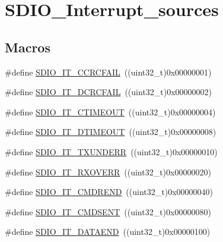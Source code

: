 \hypertarget{group___s_d_i_o___interrupt__sources}{}\section{S\+D\+I\+O\+\_\+\+Interrupt\+\_\+sources}
\label{group___s_d_i_o___interrupt__sources}
\subsection*{Macros}
\begin{DoxyCompactItemize}
\item 
\#define \mbox{\hyperlink{group___s_d_i_o___interrupt__sources_gabb076105e18355a260c40a379511e72f}{S\+D\+I\+O\+\_\+\+I\+T\+\_\+\+C\+C\+R\+C\+F\+A\+IL}}~((uint32\+\_\+t)0x00000001)
\item 
\#define \mbox{\hyperlink{group___s_d_i_o___interrupt__sources_gaf3321305cb4e24419185a4b92ead299a}{S\+D\+I\+O\+\_\+\+I\+T\+\_\+\+D\+C\+R\+C\+F\+A\+IL}}~((uint32\+\_\+t)0x00000002)
\item 
\#define \mbox{\hyperlink{group___s_d_i_o___interrupt__sources_ga3c2fdef0993f10e65d4fddbdf71febed}{S\+D\+I\+O\+\_\+\+I\+T\+\_\+\+C\+T\+I\+M\+E\+O\+UT}}~((uint32\+\_\+t)0x00000004)
\item 
\#define \mbox{\hyperlink{group___s_d_i_o___interrupt__sources_gaf5ce4bfa8459ccbe892791e5cdc26a6f}{S\+D\+I\+O\+\_\+\+I\+T\+\_\+\+D\+T\+I\+M\+E\+O\+UT}}~((uint32\+\_\+t)0x00000008)
\item 
\#define \mbox{\hyperlink{group___s_d_i_o___interrupt__sources_ga93d4dbe3162b8507b2834a3e29e6c648}{S\+D\+I\+O\+\_\+\+I\+T\+\_\+\+T\+X\+U\+N\+D\+E\+RR}}~((uint32\+\_\+t)0x00000010)
\item 
\#define \mbox{\hyperlink{group___s_d_i_o___interrupt__sources_ga272953292e1b43b2108b00e75db76512}{S\+D\+I\+O\+\_\+\+I\+T\+\_\+\+R\+X\+O\+V\+E\+RR}}~((uint32\+\_\+t)0x00000020)
\item 
\#define \mbox{\hyperlink{group___s_d_i_o___interrupt__sources_ga6df3bb694dc00e250cd22e16a03d6910}{S\+D\+I\+O\+\_\+\+I\+T\+\_\+\+C\+M\+D\+R\+E\+ND}}~((uint32\+\_\+t)0x00000040)
\item 
\#define \mbox{\hyperlink{group___s_d_i_o___interrupt__sources_gaf9d8fc4651c4b7555fb9ee4e5af6ca63}{S\+D\+I\+O\+\_\+\+I\+T\+\_\+\+C\+M\+D\+S\+E\+NT}}~((uint32\+\_\+t)0x00000080)
\item 
\#define \mbox{\hyperlink{group___s_d_i_o___interrupt__sources_ga6cc1c521b64fc57b844336f7f175dd1e}{S\+D\+I\+O\+\_\+\+I\+T\+\_\+\+D\+A\+T\+A\+E\+ND}}~((uint32\+\_\+t)0x00000100)

\end{DoxyCompactItemize}
